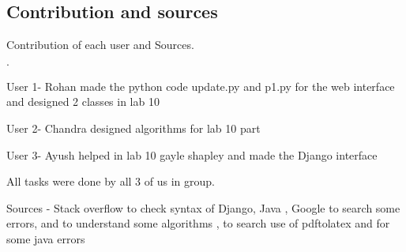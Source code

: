 \documentclass[12 pt]{article}
\begin{document}
      \subsection{Contribution and sources }
      Contribution of each user and Sources. \\
      \begin{list}{$\cdot$}
      \item User 1- Rohan made the python code update.py  and p1.py for the web interface and designed 2 classes in lab 10
      \item User 2- Chandra designed algorithms for lab 10 part
      \item User 3- Ayush helped in lab 10 gayle shapley and made the Django interface
      \item All tasks were done by all 3 of us in group.
      \item Sources - Stack overflow to check syntax of Django, Java , Google to search some errors, and to understand some algorithms , to search use of pdftolatex and for some java errors
      \end{list}
\end{document}
